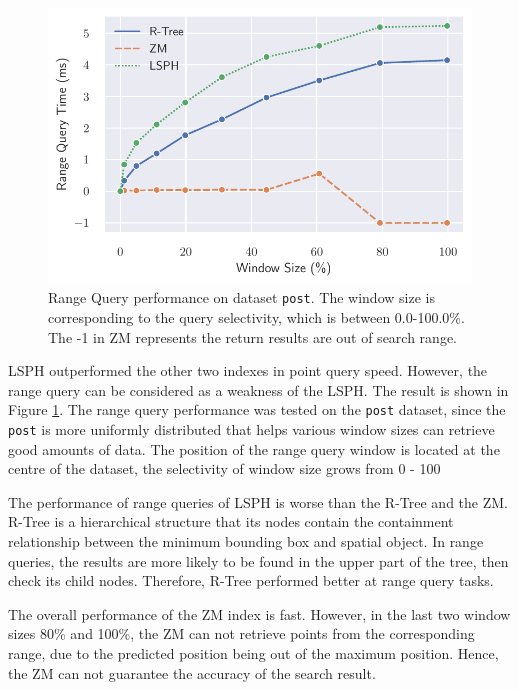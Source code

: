 \begin{figure}
    \includegraphics[width=\textwidth]{Figures/range_result.pdf}\hfill
    \caption{Range Query performance on dataset \texttt{post}. The window size is corresponding to the query selectivity, which is between 0.0-100.0\%. The -1 in ZM represents the return results are out of search range.}\label{fig:range_result}
\end{figure}

LSPH outperformed the other two indexes in point query speed. However, the range query can be considered as a weakness of the LSPH. The result is shown in Figure \ref{fig:range_result}. The range query performance was tested on the \texttt{post} dataset, since the \texttt{post} is more uniformly distributed that helps various window sizes can retrieve good amounts of data. The position of the range query window is located at the centre of the dataset, the selectivity of window size grows from 0 - 100 %

The performance of range queries of LSPH is worse than the R-Tree and the ZM. R-Tree is a hierarchical structure that its nodes contain the containment relationship between the minimum bounding box and spatial object. In range queries, the results are more likely to be found in the upper part of the tree, then check its child nodes. Therefore, R-Tree performed better at range query tasks. 

The overall performance of the ZM index is fast. However, in the last two window sizes 80\% and 100\%, the ZM can not retrieve points from the corresponding range, due to the predicted position being out of the maximum position. Hence, the ZM can not guarantee the accuracy of the search result. 


